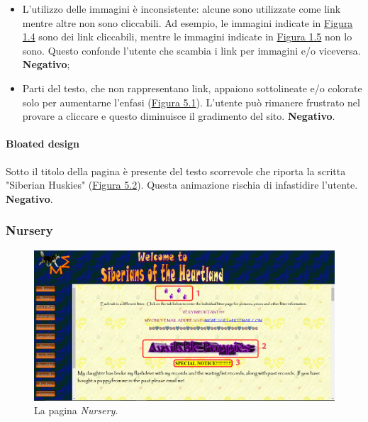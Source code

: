 \documentclass[../rapporto-usabilita.tex]{subfiles}
\begin{document}
		\begin{itemize}
	 		\item L'utilizzo delle immagini è inconsistente: alcune sono utilizzate come link mentre altre non sono cliccabili. Ad esempio, le immagini indicate in \hyperref[fig:homefocus]{Figura 1.4} sono dei link cliccabili, mentre le immagini indicate in \hyperref[fig:homefocus]{Figura 1.5} non lo sono. Questo confonde l'utente che scambia i link per immagini e/o viceversa. \textbf{Negativo};
	 		
	 		\item Parti del testo, che non rappresentano link, appaiono sottolineate e/o colorate solo per aumentarne l'enfasi (\hyperref[fig:home1]{Figura 5.1}). L'utente può rimanere frustrato nel provare a cliccare e questo diminuisce il gradimento del sito. \textbf{Negativo}.

	 	\end{itemize}
		
		\paragraph{Bloated design}
		Sotto il titolo della pagina è presente del testo scorrevole che riporta la scritta "Siberian Huskies" (\hyperref[fig:home1]{Figura 5.2}). Questa animazione  rischia di infastidire l'utente. \textbf{Negativo}.		
		
		\newpage
				
\subsubsection{Nursery}
	
		\begin{figure}[!h]
			\centering
				\includegraphics[scale=0.33]{immagini/part_nursery1.jpg}
					\caption{La pagina \textit{Nursery}.}
					\label{fig:nursery1}
		\end{figure}	
	
\end{document}

